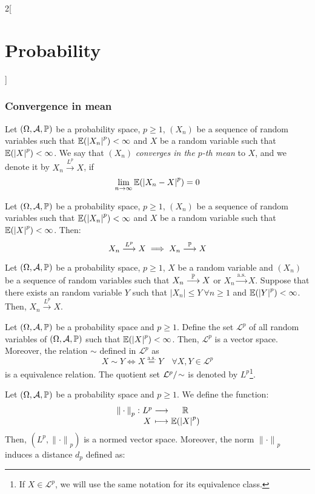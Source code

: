 \documentclass[../../../main.tex]{subfiles}
\begin{document}
\begin{multicols}{2}[\section{Probability}]
  \subsubsection{Convergence in mean}
  \begin{definition}
    Let $(\Omega,\mathcal{A},\mathbb{P})$ be a probability space, $p\geq 1$, $(X_n)$ be a sequence of random variables such that $\mathbb{E}({|X_n|}^p)<\infty$ and $X$ be a random variable such that $\mathbb{E}({|X|}^p)<\infty$. We say that $(X_n)$ \emph{converges in the $p$-th mean} to $X$, and we denote it by $X_n\overset{L^p}{\longrightarrow} X$, if  $$\lim_{n\to\infty}\mathbb{E}({|X_n-X|}^p)=0$$
  \end{definition}
  \begin{proposition}
    Let $(\Omega,\mathcal{A},\mathbb{P})$ be a probability space, $p\geq 1$, $(X_n)$ be a sequence of random variables such that $\mathbb{E}({|X_n|}^p)<\infty$ and $X$ be a random variable such that $\mathbb{E}({|X|}^p)<\infty$. Then:
    $$X_n\overset{L^p}{\longrightarrow} X\implies X_n\overset{\mathbb{P}}{\longrightarrow} X$$
  \end{proposition}
  \begin{theorem}
    Let $(\Omega,\mathcal{A},\mathbb{P})$ be a probability space, $p\geq 1$, $X$ be a random variable and $(X_n)$ be a sequence of random variables such that $X_n\overset{\mathbb{P}}{\longrightarrow}X$ or $X_n\overset{\text{a.s.}}{\longrightarrow}X$. Suppose that there exists an random variable $Y$ such that $|X_n|\leq Y\ \forall n\geq 1$ and $\mathbb{E}({|Y|}^p)<\infty$. Then, $X_n\overset{L^p}{\longrightarrow} X$.
  \end{theorem}
  \begin{lemma}
    Let $(\Omega,\mathcal{A},\mathbb{P})$ be a probability space and $p\geq 1$. Define the set $\mathcal{L}^p$ of all random variables of $(\Omega,\mathcal{A},\mathbb{P})$ such that $\mathbb{E}({|X|}^p)<\infty$. Then, $\mathcal{L}^p$ is a vector space. Moreover, the relation $\sim$ defined in $\mathcal{L}^p$ as $$X\sim Y\iff X\overset{\text{a.s.}}{=} Y\quad\forall X,Y\in\mathcal{L}^p$$ is a equivalence relation. The quotient set $\quot{\mathcal{L}^p}{\!\sim}$ is denoted by $L^p$\footnote{If $X\in\mathcal{L}^p$, we will use the same notation for its equivalence class.}.
  \end{lemma}
  \begin{proposition}
    Let $(\Omega,\mathcal{A},\mathbb{P})$ be a probability space and $p\geq 1$. We define the function:
    $$
      \function{{\|\cdot\|}_p}{L^p}{\RR}{X}{\Exp({|X|}^p)}
    $$
    Then, $(L^p,{\|\cdot\|}_p)$ is a normed vector space. Moreover, the norm ${\|\cdot\|}_p$ induces a distance $d_p$ defined as:

\end{proposition}
\end{multicols}
\end{document}

